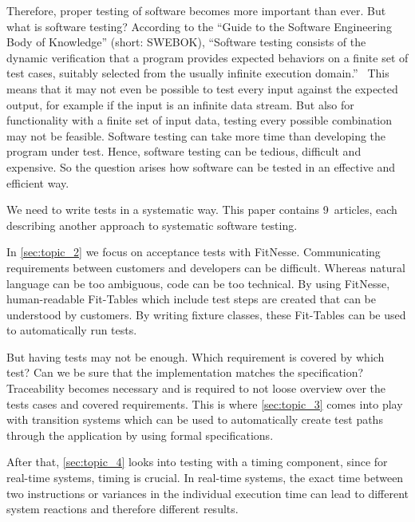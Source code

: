 Therefore, proper testing of software becomes more important than ever.
But what is software testing? According to the \enquote{Guide to the Software Engineering Body of Knowledge} (short: SWEBOK), \enquote{Software testing consists of the dynamic verification that a program provides expected behaviors on a finite set of test cases, suitably selected from the usually infinite execution domain.}~\cite{SWEBOK}
This means that it may not even be possible to test every input against the expected output, for example if the input is an infinite data stream.
But also for functionality with a finite set of input data, testing every possible combination may not be feasible.
Software testing can take more time than developing the program under test. Hence, software testing can be tedious, difficult and expensive.
So the question arises how software can be tested in an effective and efficient way.

We need to write tests in a systematic way.
This paper contains 9~articles, %
each describing another approach to systematic software testing.

In \autoref{sec:topic_2} %
we focus on acceptance tests with FitNesse.
Communicating requirements between customers and developers can be difficult.
Whereas natural language can be too ambiguous, code can be too technical.
By using FitNesse, human-readable Fit-Tables which include test steps are created that can be understood by customers. By writing fixture classes, these Fit-Tables can be used to automatically run tests.

But having tests may not be enough.
Which requirement is covered by which test?
Can we be sure that the implementation matches the specification?
Traceability becomes necessary and is required to not loose overview over the tests cases and covered requirements.
This is where
\autoref{sec:topic_3} %
comes into play with transition systems which can be used to automatically create test paths through the application by using formal specifications.


After that,
\autoref{sec:topic_4} %
looks into testing with a timing component, since for real-time systems, timing is crucial.
In real-time systems, the exact time between two instructions or variances in the individual execution time can lead to different system reactions and therefore different results.

